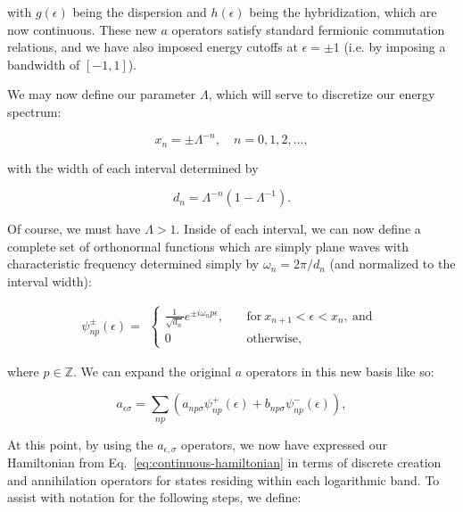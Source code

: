 with $g(\epsilon)$ being the dispersion and $h(\epsilon)$ being the hybridization, which are now continuous. These new $a$ operators satisfy standard fermionic commutation relations, and we have also imposed energy cutoffs at $\epsilon=\pm1$ (i.e. by imposing a bandwidth of $[-1,1]$).

We may now define our parameter $\Lambda$, which will serve to discretize our energy spectrum:

\begin{equation}
  x_n = \pm\Lambda^{-n}, \quad n=0,1,2,\ldots,
\end{equation}

with the width of each interval determined by

\begin{equation}
  d_n = \Lambda^{-n}(1 - \Lambda^{-1}).
\end{equation}

Of course, we must have $\Lambda > 1$. Inside of each interval, we can now define a complete set of orthonormal functions which are simply plane waves with characteristic frequency determined simply by $\omega_n = 2\pi/d_n$ (and normalized to the interval width):

\begin{equation}
  \psi^\pm_{np}(\epsilon) =
  \begin{alignedat}{1}
    \begin{cases}
      \frac{1}{\sqrt{d_n}}e^{\pm i\omega_n p\epsilon}, \quad & \text{for}\ x_{n+1} < \epsilon < x_n,\ \text{and} \\
      0 & \text{otherwise},
    \end{cases}
  \end{alignedat}
\end{equation}

where $p \in \mathbb{Z}$. We can expand the original $a$ operators in this new basis like so:

\begin{equation}
  a_{\epsilon\sigma} = \sum_{np}\left(a_{np\sigma}\psi^+_{np}(\epsilon) + b_{np\sigma}\psi^-_{np}(\epsilon)\right),
\end{equation}

At this point, by using the $a_{\epsilon,\sigma}$ operators, we now have expressed our Hamiltonian from Eq.~\eqref{eq:continuous-hamiltonian} in terms of discrete creation and annihilation operators for states residing within each logarithmic band. To assist with notation for the following steps, we define:

